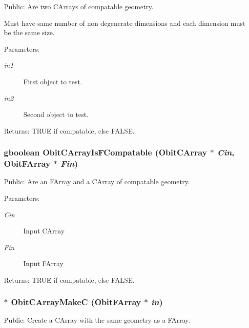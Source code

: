Public: Are two CArrays of compatable geometry. 

Must have same number of non degenerate dimensions and each dimension must be the same size. \begin{Desc}
\item[Parameters:]
\begin{description}
\item[{\em in1}]First object to test. \item[{\em in2}]Second object to test. \end{description}
\end{Desc}
\begin{Desc}
\item[Returns:]TRUE if compatable, else FALSE. \end{Desc}
\subsubsection{\setlength{\rightskip}{0pt plus 5cm}gboolean Obit\-CArray\-Is\-FCompatable ({\bf Obit\-CArray} $\ast$ {\em Cin}, {\bf Obit\-FArray} $\ast$ {\em Fin})}\label{ObitCArray_8c_a28}


Public: Are an FArray and a CArray of compatable geometry. 

\begin{Desc}
\item[Parameters:]
\begin{description}
\item[{\em Cin}]Input CArray \item[{\em Fin}]Input FArray \end{description}
\end{Desc}
\begin{Desc}
\item[Returns:]TRUE if compatable, else FALSE. \end{Desc}
\subsubsection{$\ast$ Obit\-CArray\-Make\-C ({\bf Obit\-FArray} $\ast$ {\em in})}\label{ObitCArray_8c_a27}


Public: Create a CArray with the same geometry as a FArray. 

